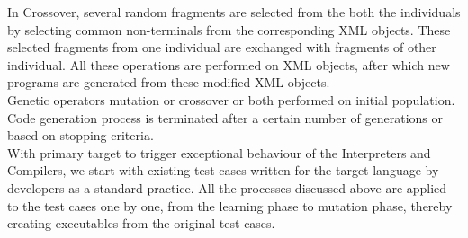 \documentclass{sig-alternate}
\begin{document}
In Crossover, several random fragments are selected from the both the individuals by selecting common non-terminals from the corresponding XML objects. These selected fragments from one individual are exchanged with fragments of other individual. All these operations are performed on XML objects, after which new programs are generated from these modified XML objects.\\
\indent Genetic operators mutation or crossover or both performed on initial population. Code generation process is terminated after a certain number of generations or based on stopping criteria. \\
\indent With primary target to trigger exceptional behaviour of the Interpreters and Compilers, we start with existing test cases written for the target language by developers as a standard practice. All the  processes discussed above are applied to the test cases one by one, from the learning phase to mutation phase, thereby creating executables from the original test cases.
\end{document}
